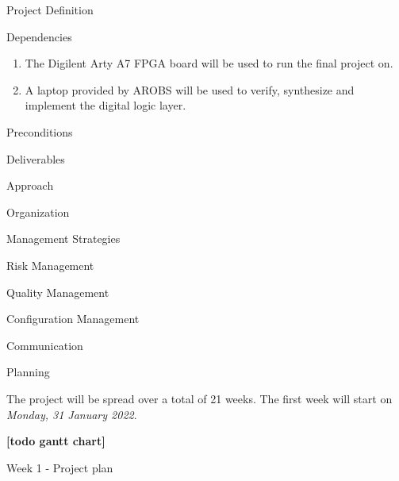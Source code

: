 \documentclass{matthijs}
\begin{document}
\begin{hoofdstuk}{Project Definition}
\begin{paragraaf}{Dependencies}
			\begin{enumerate}

				\item The Digilent Arty A7 FPGA board will be used to run the final project on.
				\item A laptop provided by AROBS will be used to verify, synthesize and implement the digital logic layer.
		
			\end{enumerate}

		\end{paragraaf}

		\begin{paragraaf}{Preconditions}

		\end{paragraaf}

	\end{hoofdstuk}

	\begin{hoofdstuk}{Deliverables}

	\end{hoofdstuk}

	\begin{hoofdstuk}{Approach}

	\end{hoofdstuk}

	\begin{hoofdstuk}{Organization}

	\end{hoofdstuk}

	\begin{hoofdstuk}{Management Strategies}

		\begin{paragraaf}{Risk Management}

		\end{paragraaf}
		
		\begin{paragraaf}{Quality Management}

		\end{paragraaf}

		\begin{paragraaf}{Configuration Management}

		\end{paragraaf}

		\begin{paragraaf}{Communication}

		\end{paragraaf}

	\end{hoofdstuk}

	\begin{hoofdstuk}{Planning}

		The project will be spread over a total of 21 weeks.
		The first week will start on \textit{Monday, 31 January 2022}.

		\textbf{[todo gantt chart]}

		Week 1 - Project plan

		
	\end{hoofdstuk}

	\clearpage
	\thispagestyle{empty}
	\addtocounter{page}{-1}
	\
	\clearpage
\end{document}
